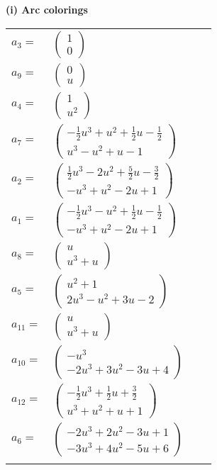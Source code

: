 \documentclass[1p]{elsarticle_modified}
\theoremstyle{definition}
\begin{document}
\flushleft \textbf{(i) Arc colorings}\\
\begin{tabular}{m{7pt} m{180pt} m{7pt} m{180pt} }
\flushright $a_{3}=$&$\begin{pmatrix}1\\0\end{pmatrix}$ \\
\flushright $a_{9}=$&$\begin{pmatrix}0\\u\end{pmatrix}$ \\
\flushright $a_{4}=$&$\begin{pmatrix}1\\u^2\end{pmatrix}$ \\
\flushright $a_{7}=$&$\begin{pmatrix}-\frac{1}{2} u^3+u^2+\frac{1}{2} u-\frac{1}{2}\\u^3- u^2+u-1\end{pmatrix}$ \\
\flushright $a_{2}=$&$\begin{pmatrix}\frac{1}{2} u^3-2 u^2+\frac{5}{2} u-\frac{3}{2}\\- u^3+u^2-2 u+1\end{pmatrix}$ \\
\flushright $a_{1}=$&$\begin{pmatrix}-\frac{1}{2} u^3- u^2+\frac{1}{2} u-\frac{1}{2}\\- u^3+u^2-2 u+1\end{pmatrix}$ \\
\flushright $a_{8}=$&$\begin{pmatrix}u\\u^3+u\end{pmatrix}$ \\
\flushright $a_{5}=$&$\begin{pmatrix}u^2+1\\2 u^3- u^2+3 u-2\end{pmatrix}$ \\
\flushright $a_{11}=$&$\begin{pmatrix}u\\u^3+u\end{pmatrix}$ \\
\flushright $a_{10}=$&$\begin{pmatrix}- u^3\\-2 u^3+3 u^2-3 u+4\end{pmatrix}$ \\
\flushright $a_{12}=$&$\begin{pmatrix}-\frac{1}{2} u^3+\frac{1}{2} u+\frac{3}{2}\\u^3+u^2+u+1\end{pmatrix}$ \\
\flushright $a_{6}=$&$\begin{pmatrix}-2 u^3+2 u^2-3 u+1\\-3 u^3+4 u^2-5 u+6\end{pmatrix}$\\&\end{tabular}
\end{document}
